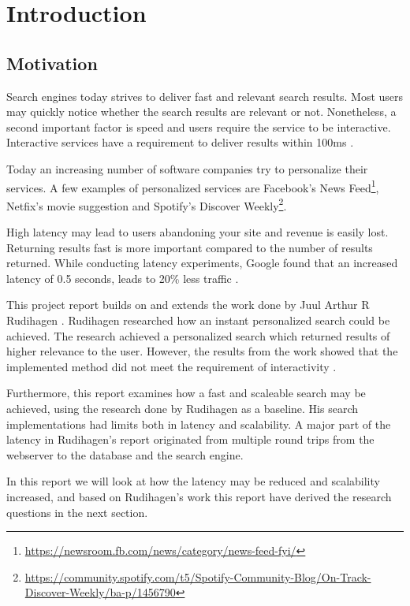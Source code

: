 \chapter{Introduction}
\section{Motivation}
Search engines today strives to deliver fast and relevant search results.
Most users may quickly notice whether the search results are relevant or not.
Nonetheless, a second important factor is speed and users require the service to be interactive.
Interactive services have a requirement to deliver results within 100ms \cite{google-latency}.

Today an increasing number of software companies try to personalize their services.
A few examples of personalized services are Facebook's News Feed\footnote{\url{https://newsroom.fb.com/news/category/news-feed-fyi/}},
Netfix's movie suggestion \cite{netflix-recommendation} and Spotify's Discover Weekly\footnote{\url{https://community.spotify.com/t5/Spotify-Community-Blog/On-Track-Discover-Weekly/ba-p/1456790}}.

High latency may lead to users abandoning your site and revenue is easily lost.
Returning results fast is more important compared to the number of results returned.
While conducting latency experiments, Google found that an increased latency of 0.5 seconds, leads to 20\% less traffic \cite{google-marissa}.

This project report builds on and extends the work done by Juul Arthur R Rudihagen \cite{master-thesis}.
Rudihagen researched how an instant personalized search could be achieved.
The research achieved a personalized search which returned results of higher relevance to the user.
However, the results from the work showed that the implemented method did not meet the requirement of interactivity \cite{master-thesis}.

Furthermore, this report examines how a fast and scaleable search may be achieved, using the research done by Rudihagen as a baseline.
His search implementations had limits both in latency and scalability.
A major part of the latency in Rudihagen's report originated from multiple round trips from the webserver to the database and the search engine.

In this report we will look at how the latency may be reduced and scalability increased,
and based on Rudihagen's work this report have derived the research questions in the next section.

